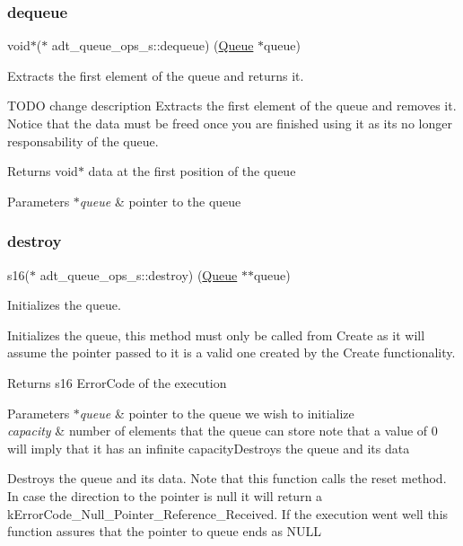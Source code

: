 \subsubsection{\texorpdfstring{dequeue}{dequeue}}
{\footnotesize\ttfamily void$\ast$($\ast$ adt\+\_\+queue\+\_\+ops\+\_\+s\+::dequeue) (\hyperlink{structadt__queue__s}{Queue} $\ast$queue)}



Extracts the first element of the queue and returns it. 

T\+O\+DO change description Extracts the first element of the queue and removes it. Notice that the data must be freed once you are finished using it as it\textquotesingle{}s no longer responsability of the queue.

\begin{DoxyReturn}{Returns}
void$\ast$ data at the first position of the queue 
\end{DoxyReturn}

\begin{DoxyParams}{Parameters}
{\em $\ast$queue} & pointer to the queue \\
\hline
\end{DoxyParams}
\mbox{\label{structadt__queue__ops__s_acaf2cfe4ce1d1d5acb1f39ebcd56d8a1}} 
\subsubsection{\texorpdfstring{destroy}{destroy}}
{\footnotesize\ttfamily s16($\ast$ adt\+\_\+queue\+\_\+ops\+\_\+s\+::destroy) (\hyperlink{structadt__queue__s}{Queue} $\ast$$\ast$queue)}



Initializes the queue. 

Initializes the queue, this method must only be called from Create as it will assume the pointer passed to it is a valid one created by the Create functionality.

\begin{DoxyReturn}{Returns}
s16 Error\+Code of the execution 
\end{DoxyReturn}

\begin{DoxyParams}{Parameters}
{\em $\ast$queue} & pointer to the queue we wish to initialize \\
\hline
{\em capacity} & number of elements that the queue can store note that a value of 0 will imply that it has an infinite capacity\+Destroys the queue and it\textquotesingle{}s data\\
\hline
\end{DoxyParams}
Destroys the queue and its data. Note that this function calls the reset method. In case the direction to the pointer is null it will return a k\+Error\+Code\+\_\+\+Null\+\_\+\+Pointer\+\_\+\+Reference\+\_\+\+Received. If the execution went well this function assures that the pointer to queue ends as N\+U\+LL

